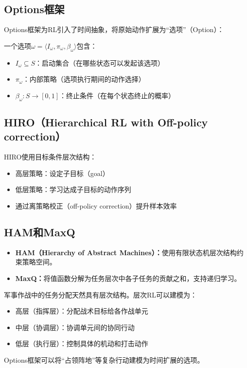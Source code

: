 \subsection{Options框架}

Options框架为RL引入了时间抽象，将原始动作扩展为``选项''（Option）：

\begin{definition}[Option]
一个选项$\omega = \langle I_\omega, \pi_\omega, \beta_\omega \rangle$包含：
\begin{itemize}
  \item $I_\omega \subseteq S$：启动集合（在哪些状态可以发起该选项）
  \item $\pi_\omega$：内部策略（选项执行期间的动作选择）
  \item $\beta_\omega: S \rightarrow [0,1]$：终止条件（在每个状态终止的概率）
\end{itemize}
\end{definition}

\subsection{HIRO（Hierarchical RL with Off-policy correction）}

HIRO使用目标条件层次结构：
\begin{itemize}
  \item 高层策略：设定子目标（goal）
  \item 低层策略：学习达成子目标的动作序列
  \item 通过离策略校正（off-policy correction）提升样本效率
\end{itemize}

\subsection{HAM和MaxQ}

\begin{itemize}
  \item \textbf{HAM（Hierarchy of Abstract Machines）：}使用有限状态机层次结构约束策略空间。
  \item \textbf{MaxQ：}将值函数分解为任务层次中各子任务的贡献之和，支持递归学习。
\end{itemize}

\begin{appbox}[title={\textbf{应用：军事任务分配中的层次决策}}]
军事作战中的任务分配天然具有层次结构。层次RL可以建模为：
\begin{itemize}
  \item 高层（指挥层）：分配战术目标给各作战单元
  \item 中层（协调层）：协调单元间的协同行动
  \item 低层（执行层）：控制具体的机动和打击动作
\end{itemize}
Options框架可以将``占领阵地''等复杂行动建模为时间扩展的选项。
\end{appbox}


